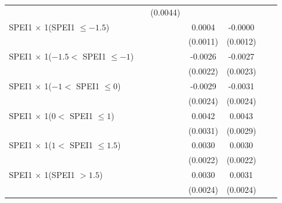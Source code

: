 {\begin{tabular}{l*{6}{c}}
                    &                     &    (0.0044)         &                     &                     &                     &                     \\
\addlinespace
SPEI1 $\times$ 1(SPEI1 $\leq -1.5$)&                     &                     &      0.0004         &     -0.0000         &                     &                     \\
                    &                     &                     &    (0.0011)         &    (0.0012)         &                     &                     \\
\addlinespace
SPEI1 $\times$ 1($-1.5 <$ SPEI1 $\leq -1$)&                     &                     &     -0.0026         &     -0.0027         &                     &                     \\
                    &                     &                     &    (0.0022)         &    (0.0023)         &                     &                     \\
\addlinespace
SPEI1 $\times$ 1($-1 <$ SPEI1 $\leq 0$)&                     &                     &     -0.0029         &     -0.0031         &                     &                     \\
                    &                     &                     &    (0.0024)         &    (0.0024)         &                     &                     \\
\addlinespace
SPEI1 $\times$ 1($0 <$ SPEI1 $\leq 1$)&                     &                     &      0.0042         &      0.0043         &                     &                     \\
                    &                     &                     &    (0.0031)         &    (0.0029)         &                     &                     \\
\addlinespace
SPEI1 $\times$ 1($1 <$ SPEI1 $\leq 1.5$)&                     &                     &      0.0030         &      0.0030         &                     &                     \\
                    &                     &                     &    (0.0022)         &    (0.0022)         &                     &                     \\
\addlinespace
SPEI1 $\times$ 1(SPEI1 $> 1.5$)&                     &                     &      0.0030         &      0.0031         &                     &                     \\
                    &                     &                     &    (0.0024)         &    (0.0024)         &                     &                     \\

\end{tabular}}
